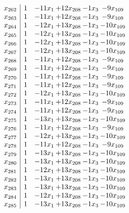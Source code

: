 \documentclass[11pt]{article}
\begin{document}
\[\begin{array}{c| c c@{\hskip 2pt} c@{\hskip 2pt} c@{\hskip 2pt} c@{\hskip 2pt} }
 x_{262}   &  1 & -11 x_{1} & + 12 x_{208} & -1 x_{3} & -9 x_{109}\\
 x_{263}   &  1 & -11 x_{1} & + 12 x_{208} & -1 x_{3} & -9 x_{109}\\
 x_{264}   &  1 & -12 x_{1} & + 13 x_{208} & -1 x_{3} & -10 x_{109}\\
 x_{265}   &  1 & -12 x_{1} & + 13 x_{208} & -1 x_{3} & -10 x_{109}\\
 x_{266}   &  1 & -12 x_{1} & + 13 x_{208} & -1 x_{3} & -10 x_{109}\\
 x_{267}   &  1 & -12 x_{1} & + 13 x_{208} & -1 x_{3} & -10 x_{109}\\
 x_{268}   &  1 & -11 x_{1} & + 12 x_{208} & -1 x_{3} & -9 x_{109}\\
 x_{269}   &  1 & -11 x_{1} & + 12 x_{208} & -1 x_{3} & -9 x_{109}\\
 x_{270}   &  1 & -11 x_{1} & + 12 x_{208} & -1 x_{3} & -9 x_{109}\\
 x_{271}   &  1 & -11 x_{1} & + 12 x_{208} & -1 x_{3} & -9 x_{109}\\
 x_{272}   &  1 & -12 x_{1} & + 13 x_{208} & -1 x_{3} & -10 x_{109}\\
 x_{273}   &  1 & -11 x_{1} & + 12 x_{208} & -1 x_{3} & -9 x_{109}\\
 x_{274}   &  1 & -11 x_{1} & + 12 x_{208} & -1 x_{3} & -9 x_{109}\\
 x_{275}   &  1 & -13 x_{1} & + 13 x_{208} & -1 x_{3} & -10 x_{109}\\
 x_{276}   &  1 & -11 x_{1} & + 12 x_{208} & -1 x_{3} & -9 x_{109}\\
 x_{277}   &  1 & -12 x_{1} & + 13 x_{208} & -1 x_{3} & -10 x_{109}\\
 x_{278}   &  1 & -11 x_{1} & + 12 x_{208} & -1 x_{3} & -9 x_{109}\\
 x_{279}   &  1 & -13 x_{1} & + 13 x_{208} & -1 x_{3} & -10 x_{109}\\
 x_{280}   &  1 & -13 x_{1} & + 13 x_{208} & -1 x_{3} & -10 x_{109}\\
 x_{281}   &  1 & -12 x_{1} & + 13 x_{208} & -1 x_{3} & -10 x_{109}\\
 x_{282}   &  1 & -13 x_{1} & + 13 x_{208} & -1 x_{3} & -10 x_{109}\\
 x_{283}   &  1 & -13 x_{1} & + 13 x_{208} & -1 x_{3} & -10 x_{109}\\
 x_{284}   &  1 & -12 x_{1} & + 13 x_{208} & -1 x_{3} & -10 x_{109}\\
 x_{285}   &  1 & -13 x_{1} & + 13 x_{208} & -1 x_{3} & -10 x_{109}\\

\end{array}\]
\end{document}
